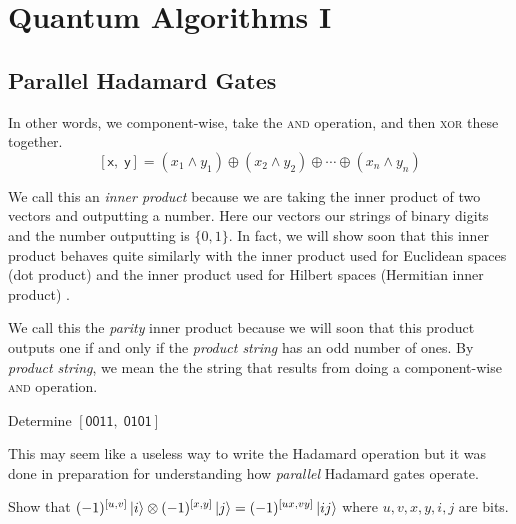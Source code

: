 
\chapter{Quantum Algorithms I}


\section{Parallel Hadamard Gates}







In other words, we component-wise, take the \textsc{and} operation, and then \textsc{xor} these together.
$$[\textsf{x}, \; \textsf{y}] = (x_1 \wedge y_1) \oplus (x_2 \wedge y_2) \oplus \dotsm \oplus (x_n \wedge y_n)$$

We call this an \textit{inner product} because we are taking the inner product 
of two vectors and outputting a number. Here our vectors our strings of binary digits
and the number outputting is $\{0,1\}$. In fact, we will show soon that this 
inner product behaves quite similarly with the inner product used for Euclidean spaces (dot product) 
and the inner product used for Hilbert spaces (Hermitian inner product) .

We call this the \textit{parity} inner product because we will soon that this product 
outputs one if and only if the \textit{product string} has an odd number of ones.
By \textit{product string}, we mean the the string that results 
from doing a component-wise \textsc{and} operation.

\frmrule

\begin{example}
Determine $[\textsf{0011}, \; \textsf{0101}]$ 
\end{example}



\frmrule

This may seem like a useless way to write the Hadamard operation but it was done in preparation 
for understanding how \textit{parallel} Hadamard gates operate. 




\frmrule

\begin{example}
Show that $(-1)^{[u,v]}\left|i\right\rangle \otimes (-1)^{[x,y]}\left|j\right\rangle = (-1)^{[ux,vy]}\left|ij\right\rangle$ 
where $u,v,x,y,i,j$ are bits.
\end{example}


